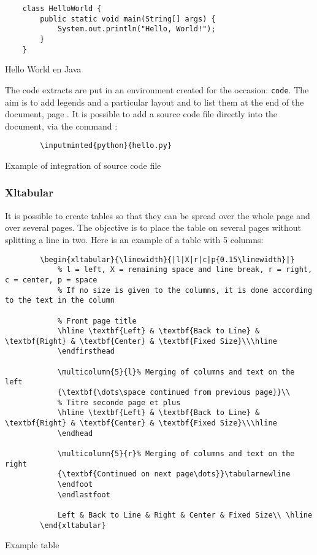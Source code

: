 \begin{code}
    \begin{verbatim}
    class HelloWorld {
        public static void main(String[] args) {
            System.out.println("Hello, World!");
        }
    }
\end{verbatim}
    \caption{Hello World en Java}
\end{code}

The code extracts are put in an environment created for the occasion: \texttt{code}.
The aim is to add legends and a particular layout and to list them at the end of the document,
page \pageref{TableOfCode}.
It is possible to add a source code file directly into the document, via the command :
\begin{code}
    \begin{verbatim}
        \inputminted{python}{hello.py}
\end{verbatim}
    \caption{Example of integration of source code file}
\end{code}

\subsubsection{Xltabular}
It is possible to create tables so that they can be spread over the whole page and over several
pages. The objective is to place the table on several pages without splitting a line in two.
Here is an example of a table with 5 columns:
\begin{code}
    \begin{verbatim}
        \begin{xltabular}{\linewidth}{|l|X|r|c|p{0.15\linewidth}|}
            % l = left, X = remaining space and line break, r = right, c = center, p = space
            % If no size is given to the columns, it is done according to the text in the column

            % Front page title
            \hline \textbf{Left} & \textbf{Back to Line} & \textbf{Right} & \textbf{Center} & \textbf{Fixed Size}\\\hline
            \endfirsthead

            \multicolumn{5}{l}% Merging of columns and text on the left
            {\textbf{\dots\space continued from previous page}}\\
            % Titre seconde page et plus
            \hline \textbf{Left} & \textbf{Back to Line} & \textbf{Right} & \textbf{Center} & \textbf{Fixed Size}\\\hline
            \endhead

            \multicolumn{5}{r}% Merging of columns and text on the right
            {\textbf{Continued on next page\dots}}\tabularnewline
            \endfoot
            \endlastfoot

            Left & Back to Line & Right & Center & Fixed Size\\ \hline
        \end{xltabular}
\end{verbatim}
    \caption{Example table}
\end{code}

